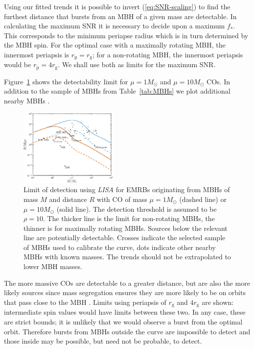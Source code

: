 \documentclass[useAMS,usedcolumn,usegraphicx,usenatbib]{mn2e}
\newcommand{\eqnref}[1]{(\ref{eq:#1})}
\newcommand{\Figref}[1]{Figure~\ref{fig:#1}}
\newcommand{\tabref}[1]{Table~\ref{tab:#1}}
\newcommand{\sub}[1]{\ensuremath{_\mathrm{#1}}}
\begin{document}
Using our fitted trends it is possible to invert \eqnref{SNR-scaling} to find the furthest distance that bursts from an MBH of a given mass are detectable. In calculating the maximum SNR it is necessary to decide upon a maximum $f_\ast$. This corresponds to the minimum periapse radius which is in turn determined by the MBH spin. For the optimal case with a maximally rotating MBH, the innermost periapsis is $r\sub{p} = r\sub{g}$; for a non-rotating MBH, the innermost periapsis would be $r\sub{p} = 4r\sub{g}$. We shall use both as limits for the maximum SNR.

\Figref{detect} shows the detectability limit for $\mu = 1 M_\odot$ and $\mu = 10 M_\odot$ COs. In addition to the sample of MBHs from \tabref{MBHs} we plot additional nearby MBHs \citep[see][and references therein]{Graham2008,Graham2011,Graham2013}.
\begin{figure}
\begin{center}
 \includegraphics[width=0.43\textwidth]{Fig_M_R_detect_1}
 \caption{Limit of detection using \textit{LISA} for EMRBs originating from MBHs of mass $M$ and distance $R$ with CO of mass $\mu = 1 M_\odot$ (dashed line) or $\mu = 10 M_\odot$ (solid line). The detection threshold is assumed to be $\rho = 10$. The thicker line is the limit for non-rotating MBHs, the thinner is for maximally rotating MBHs. Sources below the relevant line are potentially detectable. Crosses indicate the selected sample of MBHs used to calibrate the curve, dots indicate other nearby MBHs with known masses. The trends should not be extrapolated to lower MBH masses.\label{fig:detect}}
   \end{center}
\end{figure}
The more massive COs are detectable to a greater distance, but are also the more likely sources since mass segregation ensures they are more likely to be on orbits that pass close to the MBH \citep{Bahcall1977, Alexander2009, Preto2010}. Limits using periapsis of $r\sub{g}$ and $4r\sub{g}$ are shown: intermediate spin values would have limits between these two. In any case, these are strict bounds; it is unlikely that we would observe a burst from the optimal orbit. Therefore bursts from MBHs outside the curve are impossible to detect and those inside may be possible, but need not be probable, to detect.
\end{document}
